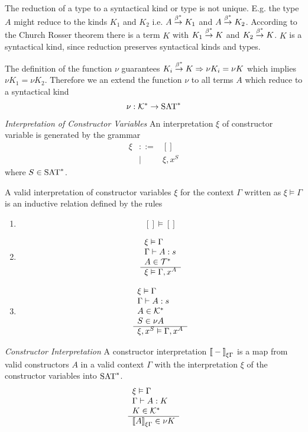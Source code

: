 The reduction of a type to a syntactical kind or type is not unique. E.g. the
type $A$ might reduce to the kinds $K_1$ and $K_2$ i.e. $A \stackrel{\beta^*}{\to} K_1$ and
$A \stackrel{\beta^*}{\to} K_2$. According to the Church Rosser theorem there is a term $K$
with $K_1 \stackrel{\beta^*}{\to} K$ and $K_2 \stackrel{\beta^*}{\to} K$. $K$ is a syntactical kind,
since reduction preserves syntactical kinds and types.

The definition of the function $\nu$ guarantees $K_i \stackrel{\beta^*}{\to} K \Rightarrow \nu K_i
= \nu K$ which implies $\nu K_1 = \nu K_2$. Therefore we an extend the function
$\nu$ to all terms $A$ which reduce to a syntactical kind
$$
\nu : {\cal K}^* \to \text{SAT}^*
$$


\begin{definition}
    \emph{Interpretation of Constructor Variables} An interpretation $\xi$ of
    constructor variable is generated by the grammar
    $$
    \begin{array}{lll}
        \xi &::=& []
        \\
        &\mid& \xi, x^S
    \end{array}
    $$
    where $S \in \text{SAT}^*$.

    A valid interpretation of constructor variables $\xi$ for the
    context $\Gamma$ written as $\xi \vDash \Gamma$ is an inductive relation
    defined by the rules
    \begin{enumerate}
    \item
        $$
            [] \vDash []
        $$

    \item
        $$
        \begin{array}{l} 
            \xi \vDash \Gamma
            \\
            \Gamma \vdash A: s
            \\
            A \in {\cal T}^*
         \\ \hline 
            \xi \vDash \Gamma, x^A
        \end{array}
        $$
    \item
        $$
        \begin{array}{l} 
            \xi \vDash \Gamma
            \\
            \Gamma \vdash A: s
            \\
            A \in {\cal K}^*
            \\
            S \in \nu A
         \\ \hline 
            \xi, x^S \vDash \Gamma, x^A
        \end{array}
        $$
    \end{enumerate}
\end{definition}


\begin{definition}
    \emph{Constructor Interpretation}  A constructor interpretation
    ${{[\![} -{]\!]}}_{\xi \Gamma}$ is a map from valid constructors $A$ in a valid
    context $\Gamma$ with the interpretation $\xi$ of the constructor variables
    into $\text{SAT}^*$.
    $$
    \begin{array}{l} 
        \xi \vDash \Gamma
        \\
        \Gamma \vdash A: K
        \\
        K \in {\cal K}^*
     \\ \hline 
        {{[\![}A{]\!]}}_{\xi \Gamma} \in \nu K
    \end{array}
    $$
\end{definition}
